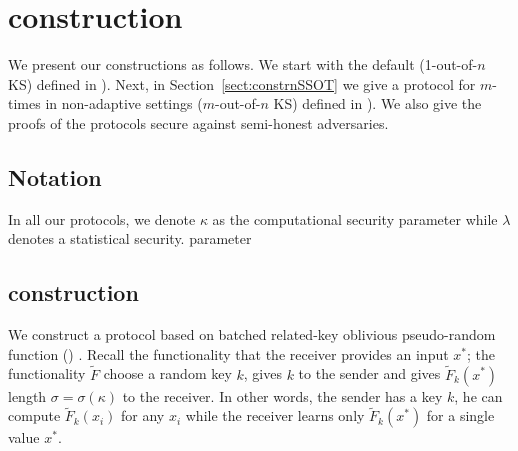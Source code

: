 
\section{\OPPRF construction}

We present our constructions as follows.  We start with the default \OPPRF  (1-out-of-$n$ KS) defined in ).  Next, in Section~\ref{sect:constrnSSOT} we give a protocol for $m$-times  \OPPRF  in non-adaptive settings ($m$-out-of-$n$ KS) defined in ). We also give the proofs of the protocols secure against semi-honest adversaries.


\subsection{Notation}
In all our protocols, we denote $\kappa$ as the computational security parameter while $\lambda$ denotes a statistical security.
parameter
\subsection{\OPPRF construction}
\label{sect:constr1SSOT}

We construct a \OPPRF protocol based on batched related-key oblivious pseudo-random function (\batchOPRF) \cite{CCS:KKRT16}. Recall the  \batchOPRF functionality that the receiver provides an input $x^*$; the functionality $\widetilde F$ choose a random key $k$, gives $k$ to the sender and gives $\widetilde F_k(x^*)$ length $\sigma=\sigma(\kappa)$ to the receiver. In other words, the sender has a key $k$, he can compute $\widetilde F_k(x_i)$ for any $x_i$ while the receiver learns only $\widetilde F_k(x^*)$ for a single value $x^*$. 

